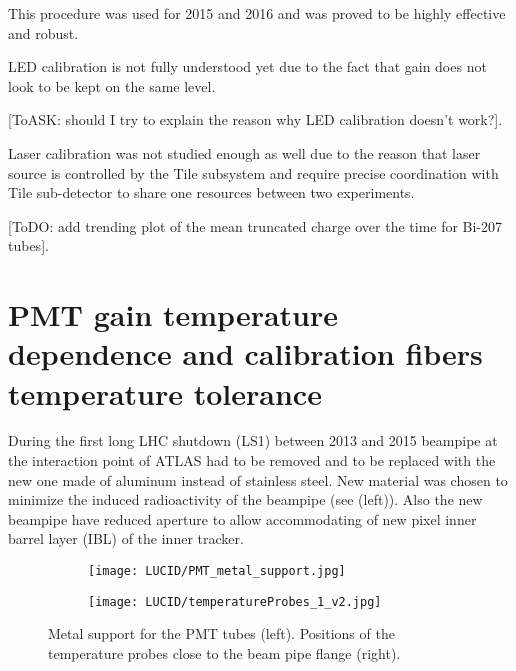 This procedure was used for 2015 and 2016 and was proved to be highly effective and robust.

LED calibration is not fully understood yet due to the fact that gain does not look to be kept on the same level.

[ToASK: should I try to explain the reason why LED calibration doesn't work?].

Laser calibration was not studied enough as well due to the reason that laser source is controlled by the Tile subsystem and require 
precise coordination with Tile sub-detector to share one resources between two experiments.

[ToDO: add trending plot of the mean truncated charge over the time for Bi-207 tubes].




% 
% 


\section{PMT gain temperature dependence and calibration fibers temperature tolerance}
\label{sec:tempMeas}

During the first long LHC shutdown (LS1) between 2013 and 2015 beampipe at the interaction point of ATLAS
had to be removed and to be replaced with the new one made of aluminum instead of stainless steel.
New material was chosen to minimize the induced radioactivity of the beampipe (see  (left)).
Also the new beampipe have reduced aperture to allow accommodating of new pixel inner barrel layer (IBL) of the inner tracker.

\begin{figure}
\centering
\begin{subfigure}{.6\textwidth}
  \centering
  \texttt{[image: LUCID/PMT\_metal\_support.jpg]}
\end{subfigure}%
\begin{subfigure}{.4\textwidth}
  \centering
  \texttt{[image: LUCID/temperatureProbes\_1\_v2.jpg]}
\end{subfigure}
\caption{Metal support for the PMT tubes (left). Positions of the temperature probes close to the beam pipe flange (right).}
\label{fig:metalSupportAndTempProbes}
\end{figure}


